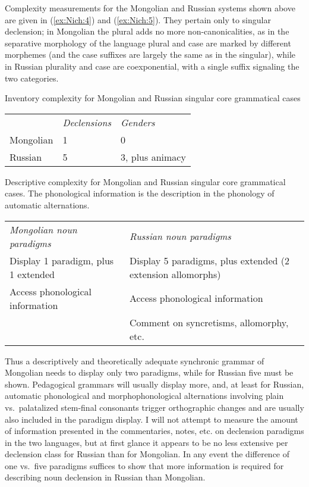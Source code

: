 \documentclass[output=collectionpaper]{langsci/langscibook}
\begin{document}
Complexity measurements for the Mongolian and Russian systems shown above are given in (\ref{ex:Nich:4}) and (\ref{ex:Nich:5}). They pertain only to singular declension; in Mongolian the plural adds no more non-canonicalities, as in the separative morphology of the language plural and case are marked by different morphemes (and the case suffixes are largely the same as in the singular), while in Russian plurality and case are coexponential, with a single suffix signaling the two categories.

\ea
\label{ex:Nich:4}
Inventory complexity for Mongolian and Russian singular core grammatical cases \\
\medskip
\begin{tabular}{lll}
				 &\textit{Declensions} &	\textit{Genders}\\
	Mongolian	 &	1 &		0\\
	Russian	 &	5 &		3, plus animacy\\
\end{tabular}
\z

\ea
\label{ex:Nich:5}
Descriptive complexity for Mongolian and Russian singular core grammatical cases. The phonological information is the description in the phonology of automatic alternations.\\
\medskip
\begin{tabularx}{0.8\textwidth}{XX}
	\textit{Mongolian noun paradigms}	 &		\textit{Russian noun paradigms} \\
	Display 1 paradigm, plus 1 extended	 &	Display 5 paradigms, plus extended
								(2 extension allomorphs)\\
	Access phonological information &		Access phonological information\\
							& Comment on syncretisms,
								allomorphy, etc.\\
\end{tabularx}
\z

Thus a descriptively and theoretically adequate synchronic grammar of Mongolian needs to display only two paradigms, while for Russian five must be shown. Pedagogical grammars will usually display more, and, at least for Russian, automatic phonological and morphophonological alternations involving plain vs.\ palatalized stem-final consonants trigger orthographic changes and are usually also included in the paradigm display. I will not attempt to measure the amount of information presented in the commentaries, notes, etc. on declension paradigms in the two languages, but at first glance it appears to be no less extensive per declension class for Russian than for Mongolian. In any event the difference of one vs.\ five paradigms suffices to show that more information is required for describing noun declension in Russian than Mongolian.
\end{document}
